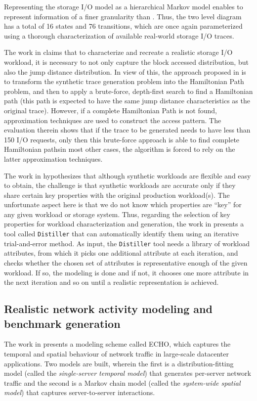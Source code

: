 Representing the storage I/O model as a hierarchical Markov model
enables to represent information of a finer granularity than \cite{storagecharacterization}.
Thus, the two level diagram has a total of 16 states and 76 transitions,
which are once again parameterized using a thorough characterization
of available real-world storage I/O traces.

The work in \cite{jump-based-synthetic} claims that to characterize
and recreate a realistic storage I/O workload, it is necessary to not
only capture the block accessed distribution, but also the jump distance
distribution. In view of this, the approach proposed in \cite{jump-based-synthetic}
is to transform the synthetic trace generation problem into the
Hamiltonian Path problem, and then to apply a brute-force, depth-first
search to find a Hamiltonian path (this path is expected to have the
same jump distance characteristics as the original trace). 
However, if a complete Hamiltonian
Path is not found, approximation techniques are used to construct 
the access pattern. The evaluation therein shows that if the
trace to be generated needs to have less than 150 I/O requests, only
then this brute-force approach is able to find complete Hamiltonian
paths\textemdash{}in most other cases, the algorithm is forced to rely on
the latter approximation techniques. 

The work in \cite{distiller} hypothesizes that although synthetic workloads
are flexible and easy to obtain, the challenge is that synthetic
workloads are accurate only if they share certain key properties
with the original production workload(s). The unfortunate aspect
here is that we do not know which properties are ``key'' for
any given workload or storage system. Thus, regarding the selection
of key properties for workload characterization
and generation, the work in \cite{distiller} presents a tool
called \texttt{Distiller} that can automatically identify
them using an iterative trial-and-error method. As input, the
\texttt{Distiller} tool needs a library of workload attributes, 
from which it picks one additional attribute at each iteration,
and checks whether the chosen set of attributes is representative
enough of the given workload. If so, the modeling is done and
if not, it chooses one more attribute in the next iteration
and so on until a realistic representation is achieved.

\subsection{Realistic network activity modeling and benchmark generation}
The work in \cite{echo} presents a modeling scheme called ECHO, which 
captures the temporal and spatial behaviour of network traffic in
large-scale datacenter applications. Two models are built, wherein
the first is a distribution-fitting model (called the \textit{single-server temporal
model}) that generates per-server
network traffic and the second is a Markov chain model (called the \textit{system-wide
spatial model}) that captures
server-to-server interactions. 

